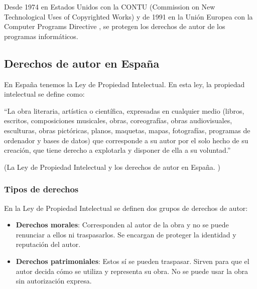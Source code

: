             Desde 1974 en Estados Unidos con la CONTU \cite{contu} (Commission on New Technological Uses of Copyrighted
            Works) y de 1991 en la Unión Europea con la Computer Programs Directive \cite{com_pro_dir}, se protegen los
            derechos de autor de los programas informáticos.


        \subsection{Derechos de autor en España} %
        \label{sub:DerechosDeAutorEnEspana}

            En España tenemos la Ley de Propiedad Intelectual. En esta ley, la propiedad intelectual se define como:

            ``La obra literaria, artística o científica, expresadas en cualquier medio (libros, escritos, composiciones
            musicales, obras, coreografías, obras audiovisuales, esculturas, obras pictóricas, planos, maquetas, mapas,
            fotografías, programas de ordenador y bases de datos) que corresponde a su autor por el solo hecho de su
            creación, que tiene derecho a explotarla y disponer de ella a su voluntad.''

            \begin{flushright}
                (La Ley de Propiedad Intelectual y los derechos de autor en España. \cite{propiedad_intelectual_espana})
            \end{flushright}

            \subsubsection{Tipos de derechos} %
            \label{ssub:TiposDeDerechos}

                En la Ley de Propiedad Intelectual se definen dos grupos de derechos de autor:

                \begin{itemize}
                    \item \textbf{Derechos morales}: Corresponden al autor de la obra y no se puede renunciar a ellos ni
                    traspasarlos. Se encargan de proteger la identidad y reputación del autor.
                    \item \textbf{Derechos patrimoniales}: Estos sí se pueden traspasar. Sirven para que el autor decida
                    cómo se utiliza y representa su obra. No se puede usar la obra sin autorización expresa.
                \end{itemize}
            
